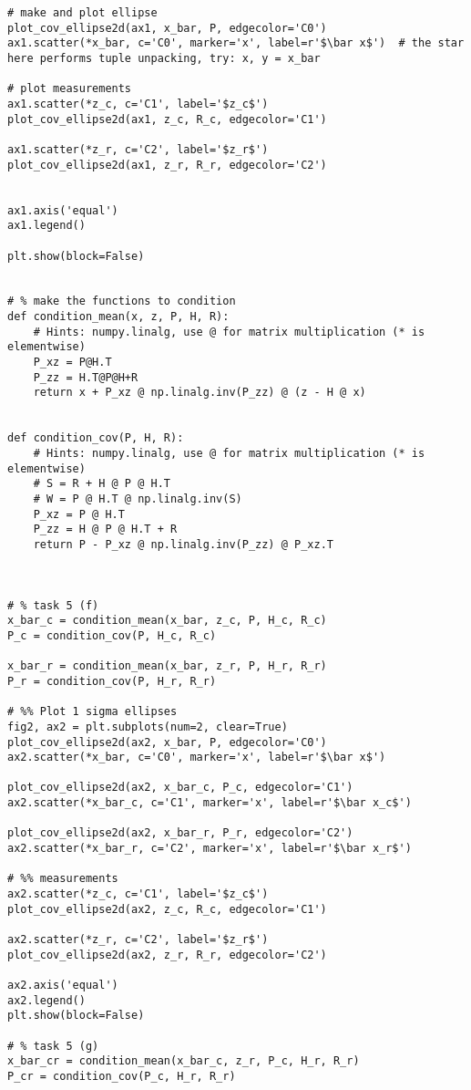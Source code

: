 \documentclass[11pt]{article}
\begin{document}
\begin{verbatim}
# make and plot ellipse
plot_cov_ellipse2d(ax1, x_bar, P, edgecolor='C0')
ax1.scatter(*x_bar, c='C0', marker='x', label=r'$\bar x$')  # the star here performs tuple unpacking, try: x, y = x_bar

# plot measurements
ax1.scatter(*z_c, c='C1', label='$z_c$')
plot_cov_ellipse2d(ax1, z_c, R_c, edgecolor='C1')

ax1.scatter(*z_r, c='C2', label='$z_r$')
plot_cov_ellipse2d(ax1, z_r, R_r, edgecolor='C2')


ax1.axis('equal')
ax1.legend()

plt.show(block=False)


# % make the functions to condition
def condition_mean(x, z, P, H, R):
    # Hints: numpy.linalg, use @ for matrix multiplication (* is elementwise)
    P_xz = P@H.T
    P_zz = H.T@P@H+R
    return x + P_xz @ np.linalg.inv(P_zz) @ (z - H @ x)


def condition_cov(P, H, R):
    # Hints: numpy.linalg, use @ for matrix multiplication (* is elementwise)
    # S = R + H @ P @ H.T
    # W = P @ H.T @ np.linalg.inv(S)
    P_xz = P @ H.T
    P_zz = H @ P @ H.T + R
    return P - P_xz @ np.linalg.inv(P_zz) @ P_xz.T



# % task 5 (f)
x_bar_c = condition_mean(x_bar, z_c, P, H_c, R_c)
P_c = condition_cov(P, H_c, R_c)

x_bar_r = condition_mean(x_bar, z_r, P, H_r, R_r)
P_r = condition_cov(P, H_r, R_r)

# %% Plot 1 sigma ellipses
fig2, ax2 = plt.subplots(num=2, clear=True)
plot_cov_ellipse2d(ax2, x_bar, P, edgecolor='C0')
ax2.scatter(*x_bar, c='C0', marker='x', label=r'$\bar x$')

plot_cov_ellipse2d(ax2, x_bar_c, P_c, edgecolor='C1')
ax2.scatter(*x_bar_c, c='C1', marker='x', label=r'$\bar x_c$')

plot_cov_ellipse2d(ax2, x_bar_r, P_r, edgecolor='C2')
ax2.scatter(*x_bar_r, c='C2', marker='x', label=r'$\bar x_r$')

# %% measurements
ax2.scatter(*z_c, c='C1', label='$z_c$')
plot_cov_ellipse2d(ax2, z_c, R_c, edgecolor='C1')

ax2.scatter(*z_r, c='C2', label='$z_r$')
plot_cov_ellipse2d(ax2, z_r, R_r, edgecolor='C2')

ax2.axis('equal')
ax2.legend()
plt.show(block=False)

# % task 5 (g)
x_bar_cr = condition_mean(x_bar_c, z_r, P_c, H_r, R_r)
P_cr = condition_cov(P_c, H_r, R_r)


\end{verbatim}
\end{document}
